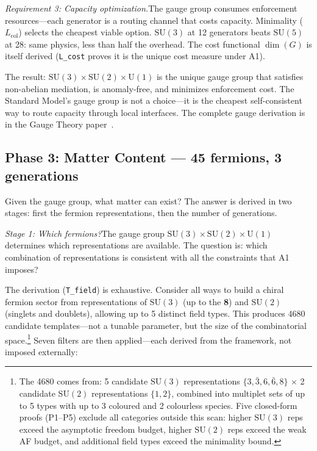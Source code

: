 \documentclass[11pt]{article}
\newcommand{\SU}{\mathrm{SU}}
\newcommand{\U}{\mathrm{U}}
\begin{document}
\textit{Requirement 3: Capacity optimization.}\quad The gauge group consumes enforcement resources---each generator is a routing channel that costs capacity.  Minimality ($L_{\mathrm{col}}$) selects the cheapest viable option.  $\SU(3)$ at 12 generators beats $\SU(5)$ at 28: same physics, less than half the overhead.  The cost functional $\dim(G)$ is itself derived (\texttt{L\_cost} proves it is the unique cost measure under A1).

The result: $\SU(3)\times\SU(2)\times\U(1)$ is the unique gauge group that satisfies non-abelian mediation, is anomaly-free, and minimizes enforcement cost.  The Standard Model's gauge group is not a choice---it is the cheapest self-consistent way to route capacity through local interfaces.  The complete gauge derivation is in the Gauge Theory paper~\cite{PGT}.


\subsection{Phase 3: Matter Content --- 45 fermions, 3 generations}

Given the gauge group, what matter can exist?  The answer is derived in two stages: first the fermion representations, then the number of generations.

\textit{Stage 1: Which fermions?}\quad The gauge group $\SU(3)\times\SU(2)\times\U(1)$ determines which representations are available.  The question is: which combination of representations is consistent with all the constraints that A1 imposes?

The derivation (\texttt{T\_field}) is exhaustive.  Consider all ways to build a chiral fermion sector from representations of $\SU(3)$ (up to the \textbf{8}) and $\SU(2)$ (singlets and doublets), allowing up to 5 distinct field types.  This produces 4680 candidate templates---not a tunable parameter, but the size of the combinatorial space.\footnote{The 4680 comes from: 5 candidate $\SU(3)$ representations $\{3, \bar{3}, 6, \bar{6}, 8\}$ $\times$ 2 candidate $\SU(2)$ representations $\{1, 2\}$, combined into multiplet sets of up to 5 types with up to 3 coloured and 2 colourless species.  Five closed-form proofs (P1--P5) exclude all categories outside this scan: higher $\SU(3)$ reps exceed the asymptotic freedom budget, higher $\SU(2)$ reps exceed the weak AF budget, and additional field types exceed the minimality bound.}  Seven filters are then applied---each derived from the framework, not imposed externally:
\end{document}
